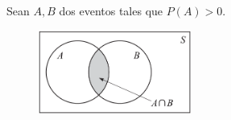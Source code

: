 %
%
% 
%
%
%
% 
%
%
% 
%
% 
%
% 
%
{}
Sean $A,B$ dos eventos tales que $P(A)>0.$
\begin{figure}[h]
 \centering
 \includegraphics[width=5cm,keepaspectratio=true]{./pe/pands0103.png}
 \label{pands0103}
\end{figure}

